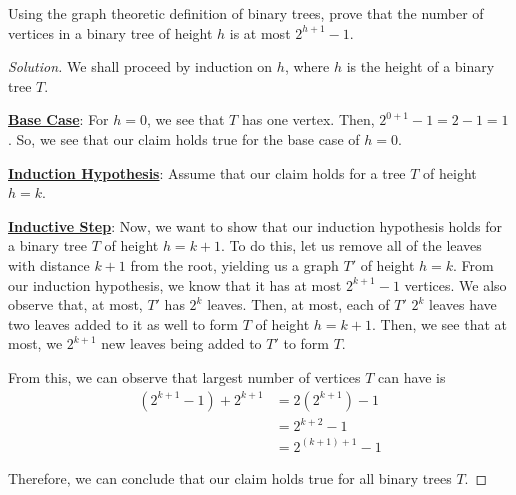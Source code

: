 \documentclass{article}
\newenvironment{solution}{\begin{proof}[Solution]}{\end{proof}}
\begin{document}
\begin{hw}
	Using the graph theoretic definition of binary trees, prove that the number of vertices in a binary tree of height $h$ is at most $2^{h+1}-1$.
\end{hw}
\begin{solution}
	We shall proceed by induction on $h$, where $h$ is the height of a binary tree $T$.
	
	\textbf{\underline{Base Case}}: For $h=0$, we see that $T$ has one vertex. Then, $2^{0+1} - 1 = 2 - 1 = 1$. So, we see that our claim holds true for the base case of $h=0$.
	
	\textbf{\underline{Induction Hypothesis}}: Assume that our claim holds for a tree $T$ of height $h=k$.
	
	\textbf{\underline{Inductive Step}}: Now, we want to show that our induction hypothesis holds for a binary tree $T$ of height $h=k+1$. To do this, let us remove all of the leaves with distance $k+1$ from the root, yielding us a graph $T'$ of height $h=k$. From our induction hypothesis, we know that it has at most $2^{k+1}-1$ vertices. We also observe that, at most, $T'$ has $2^{k}$ leaves. Then, at most, each of $T'$ $2^{k}$ leaves have two leaves added to it as well to form $T$ of height $h=k+1$. Then, we see that at most, we $2^{k+1}$ new leaves being added to $T'$ to form $T$.
	
	From this, we can observe that largest number of vertices $T$ can have is
	\begin{align*}
		\left( 2^{k+1}-1 \right) + 2^{k+1} &= 2\left( 2^{k+1} \right) - 1 \\
		&= 2^{k+2} -1 \\
		&= 2^{(k+1) + 1} - 1
	\end{align*}  
	
	Therefore, we can conclude that our claim holds true for all binary trees $T$.
\end{solution}
\end{document}
